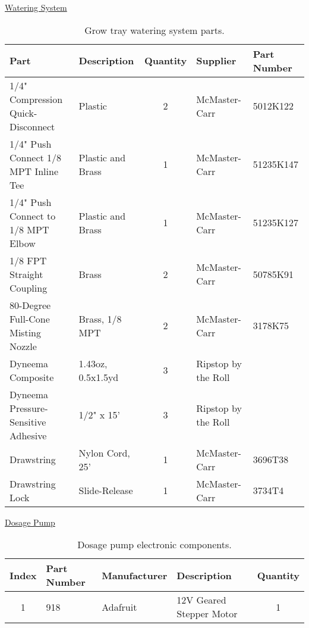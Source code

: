 \uline{Watering System}
\begin{table}[!ht]
    \centering
    \begin{tabular}{|l|l|c|l|l|}
    \hline
        Part                                    & Description           & Quantity  & Supplier              & Part Number   \\ \hline
        1/4" Compression Quick-Disconnect       & Plastic               & 2         & McMaster-Carr         & 5012K122      \\ \hline
        1/4" Push Connect 1/8 MPT Inline Tee    & Plastic and Brass     & 1         & McMaster-Carr         & 51235K147     \\ \hline
        1/4" Push Connect to 1/8 MPT Elbow      & Plastic and Brass     & 1         & McMaster-Carr         & 51235K127     \\ \hline
        1/8 FPT Straight Coupling               & Brass                 & 2         & McMaster-Carr         & 50785K91      \\ \hline
        80-Degree Full-Cone Misting Nozzle      & Brass, 1/8 MPT        & 2         & McMaster-Carr         & 3178K75       \\ \hline
        Dyneema Composite                       & 1.43oz, 0.5x1.5yd     & 3         & Ripstop by the Roll   & ~             \\ \hline
        Dyneema Pressure-Sensitive Adhesive     & 1/2" x 15'            & 3         & Ripstop by the Roll   & ~             \\ \hline
        Drawstring                              & Nylon Cord, 25'       & 1         & McMaster-Carr         & 3696T38       \\ \hline
        Drawstring Lock                         & Slide-Release         & 1         & McMaster-Carr         & 3734T4        \\ \hline
    \end{tabular}
    \caption{Grow tray watering system parts.}
    \label{tab:aeroponics_watering_parts}
\end{table}

\uline{Dosage Pump}
\begin{table}[!ht]
    \centering
    \begin{tabular}{|c|l|l|l|c|}
    \hline
        Index   & Part Number   & Manufacturer  & Description               & Quantity  \\ \hline
        1       & 918           & Adafruit      & 12V Geared Stepper Motor  & 1         \\ \hline
    \end{tabular}
    \caption{Dosage pump electronic components.}
    \label{tab:aeroponics_dosagepump_components}
\end{table}

